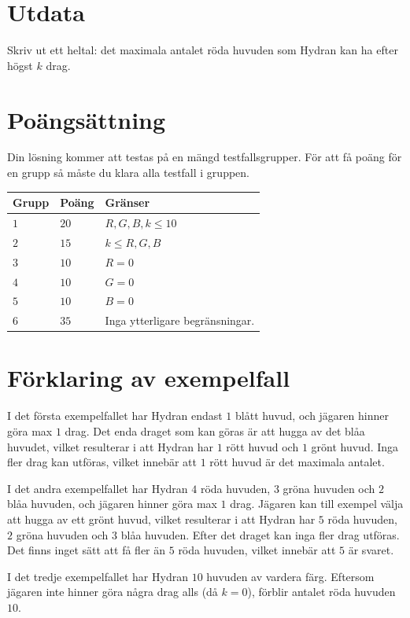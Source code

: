 \section*{Utdata}
Skriv ut ett heltal: det maximala antalet röda huvuden som Hydran kan ha efter högst $k$ drag.

\section*{Poängsättning}
Din lösning kommer att testas på en mängd testfallsgrupper.
För att få poäng för en grupp så måste du klara alla testfall i gruppen.

\noindent
\begin{tabular}{| l | l | p{12cm} |}
  \hline
  \textbf{Grupp} & \textbf{Poäng} & \textbf{Gränser} \\ \hline
  $1$    & $20$       & $R,G,B,k \leq 10$ \\ \hline
  $2$    & $15$       & $k \leq R,G,B$ \\ \hline
  $3$    & $10$       & $R = 0$ \\ \hline
  $4$    & $10$       & $G = 0$ \\ \hline
  $5$    & $10$       & $B = 0$ \\ \hline
  $6$    & $35$       & Inga ytterligare begränsningar. \\ \hline
\end{tabular}

\section*{Förklaring av exempelfall}
I det första exempelfallet har Hydran endast $1$ blått huvud, och jägaren hinner göra max $1$ drag. 
Det enda draget som kan göras är att hugga av det blåa huvudet, vilket resulterar i att Hydran har $1$ rött
huvud och $1$ grönt huvud. 
Inga fler drag kan utföras, vilket innebär att $1$ rött huvud är det maximala antalet.


I det andra exempelfallet har Hydran $4$ röda huvuden, 
$3$ gröna huvuden och $2$ blåa huvuden, och jägaren hinner göra max $1$ drag. 
Jägaren kan till exempel välja att hugga av ett grönt huvud, 
vilket resulterar i att Hydran har $5$ röda huvuden, $2$ gröna huvuden och $3$ blåa huvuden. 
Efter det draget kan inga fler drag utföras. Det finns inget sätt att få fler än $5$ röda 
huvuden, vilket innebär att $5$ är svaret.


I det tredje exempelfallet har Hydran $10$ huvuden av vardera färg. 
Eftersom jägaren inte hinner göra några drag alls (då $k = 0$), förblir antalet röda huvuden $10$.